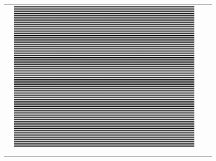 \begin{figure}[H]
\begin{tabularx}{\textwidth}{p{}CCC}
\begin{minipage}{.25\textwidth}
        \end{minipage} &
        \begin{minipage}{.25\textwidth}
            \includegraphics[width=\textwidth,keepaspectratio]{../../Figures/08_23_img64.pdf}
        \end{minipage}                                  \\
        \vspace{.5em}                                                                                                     \\
        \begin{minipage}{.05\textwidth}
            \centering
        \end{minipage}                                               &
        \begin{minipage}{.25\textwidth}
        \end{minipage}                                        &
        \begin{minipage}{.25\textwidth}
        \end{minipage}                                       &
        \begin{minipage}{.25\textwidth}
        \end{minipage}                                                                        \\

\end{tabularx}
\end{figure}
